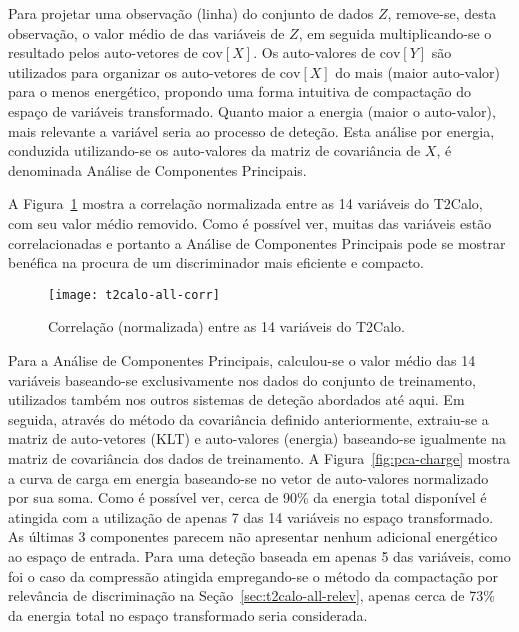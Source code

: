 Para projetar uma observação (linha) do conjunto de dados $Z$, remove-se,
desta observação, o valor médio de das variáveis de $Z$, em seguida
multiplicando-se o resultado pelos auto-vetores de $\text{cov}[X]$. Os
auto-valores de $\text{cov}[Y]$ são utilizados para organizar os auto-vetores
de $\text{cov}[X]$ do mais (maior auto-valor) para o menos energético,
propondo uma forma intuitiva de compactação do espaço de variáveis
transformado. Quanto maior a energia (maior o auto-valor), mais relevante a
variável seria ao processo de deteção. Esta análise por energia, conduzida
utilizando-se os auto-valores da matriz de covariância de $X$, é denominada
Análise de Componentes Principais.

A Figura~\ref{fig:t2calo-correl} mostra a correlação normalizada entre as 14
variáveis do T2Calo, com seu valor médio removido. Como é possível ver, muitas
das variáveis estão correlacionadas e portanto a Análise de Componentes
Principais pode se mostrar benéfica na procura de um discriminador mais
eficiente e compacto.

\begin{figure}
\begin{center}
\texttt{[image: t2calo-all-corr]}
\end{center}
\caption{Correlação (normalizada) entre as 14 variáveis do T2Calo.}
\label{fig:t2calo-correl}
\end{figure}

Para a Análise de Componentes Principais, calculou-se o valor médio das 14
variáveis baseando-se exclusivamente nos dados do conjunto de treinamento,
utilizados também nos outros sistemas de deteção abordados até aqui. Em
seguida, através do método da covariância definido anteriormente, extraiu-se a
matriz de auto-vetores (KLT) e auto-valores (energia) baseando-se igualmente
na matriz de covariância dos dados de treinamento. A
Figura~\ref{fig:pca-charge} mostra a curva de carga em energia baseando-se no
vetor de auto-valores normalizado por sua soma. Como é possível ver, cerca de
90\% da energia total disponível é atingida com a utilização de apenas 7 das
14 variáveis no espaço transformado. As últimas 3 componentes parecem não
apresentar nenhum adicional energético ao espaço de entrada. Para uma deteção
baseada em apenas 5 das variáveis, como foi o caso da compressão atingida
empregando-se o método da compactação por relevância de discriminação na
Seção~\ref{sec:t2calo-all-relev}, apenas cerca de 73\% da energia total no
espaço transformado seria considerada.

